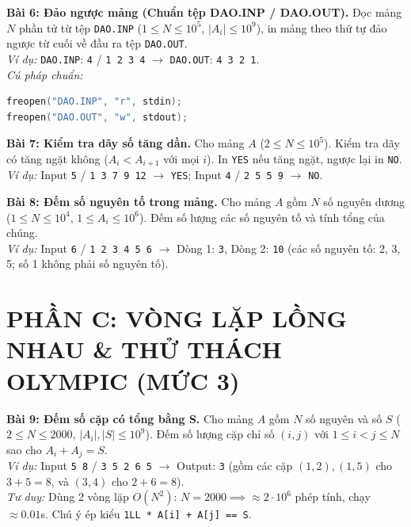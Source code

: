 \documentclass[11pt,a4paper]{article}
\begin{document}
\newpage

\textbf{\color{AsianBlue}Bài 6: Đảo ngược mảng (Chuẩn tệp DAO.INP / DAO.OUT).} Đọc mảng $N$ phần tử từ tệp \texttt{DAO.INP} ($1 \le N \le 10^5$, $|A_i| \le 10^9$), in mảng theo thứ tự đảo ngược từ cuối về đầu ra tệp \texttt{DAO.OUT}.\\
\textit{Ví dụ:} \texttt{DAO.INP}: \texttt{4} / \texttt{1 2 3 4} $\to$ \texttt{DAO.OUT}: \texttt{4 3 2 1}.\\
\textit{Cú pháp chuẩn:}
\begin{lstlisting}[language=C++]
freopen("DAO.INP", "r", stdin);
freopen("DAO.OUT", "w", stdout);
\end{lstlisting}

\vspace{0.15cm}
\noindent
\textbf{\color{AsianBlue}Bài 7: Kiểm tra dãy số tăng dần.} Cho mảng $A$ ($2 \le N \le 10^5$). Kiểm tra dãy có tăng ngặt không ($A_i < A_{i+1}$ với mọi $i$). In \texttt{YES} nếu tăng ngặt, ngược lại in \texttt{NO}.\\
\textit{Ví dụ:} Input \texttt{5} / \texttt{1 3 7 9 12} $\to$ \texttt{YES}; Input \texttt{4} / \texttt{2 5 5 9} $\to$ \texttt{NO}.

\vspace{0.15cm}
\noindent
\textbf{\color{AsianBlue}Bài 8: Đếm số nguyên tố trong mảng.} Cho mảng $A$ gồm $N$ số nguyên dương ($1 \le N \le 10^4$, $1 \le A_i \le 10^6$). Đếm số lượng các số nguyên tố và tính tổng của chúng.\\
\textit{Ví dụ:} Input \texttt{6} / \texttt{1 2 3 4 5 6} $\to$ Dòng 1: \texttt{3}, Dòng 2: \texttt{10} (các số nguyên tố: 2, 3, 5; số 1 không phải số nguyên tố).

\vspace{-0.2cm}
\section*{\color{AsianDarkBlue}\small PHẦN C: VÒNG LẶP LỒNG NHAU \& THỬ THÁCH OLYMPIC (MỨC 3)}
\vspace{-0.2cm}

\textbf{\color{AsianBlue}Bài 9: Đếm số cặp có tổng bằng S.} Cho mảng $A$ gồm $N$ số nguyên và số $S$ ($2 \le N \le 2000$, $|A_i|, |S| \le 10^9$). Đếm số lượng cặp chỉ số $(i, j)$ với $1 \le i < j \le N$ sao cho $A_i + A_j = S$.\\
\textit{Ví dụ:} Input \texttt{5 8} / \texttt{3 5 2 6 5} $\to$ Output: \texttt{3} (gồm các cặp $(1,2), (1,5)$ cho $3+5=8$, và $(3,4)$ cho $2+6=8$).\\
\textit{Tư duy:} Dùng 2 vòng lặp $O(N^2)$: $N = 2000 \implies \approx 2 \cdot 10^6$ phép tính, chạy $\approx 0.01$s. Chú ý ép kiểu \texttt{1LL * A[i] + A[j] == S}.
\end{document}
